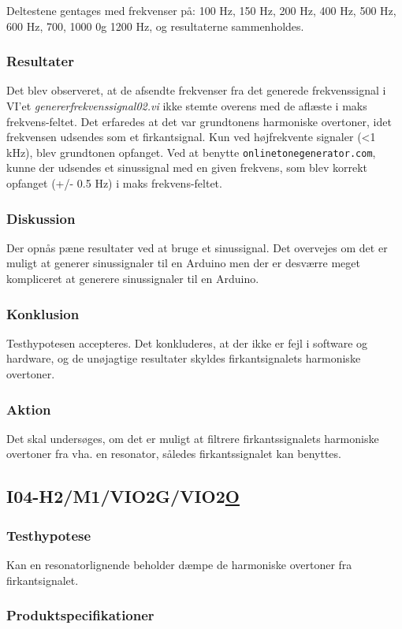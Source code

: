 			Deltestene gentages med frekvenser på: 100 Hz, 150 Hz, 200 Hz, 400 Hz, 500 Hz, 600 Hz, 700, 1000 0g 1200 Hz, og resultaterne sammenholdes. 
			
			\subsubsection{Resultater}
			 Det blev observeret, at de afsendte frekvenser fra det generede frekvenssignal i VI'et \textit{genererfrekvenssignal02.vi} ikke stemte overens med de aflæste i maks frekvens-feltet.  
			 Det erfaredes at det var grundtonens harmoniske overtoner, idet frekvensen udsendes som et firkantsignal. Kun ved højfrekvente signaler (<1 kHz), blev grundtonen opfanget. 
			 Ved at benytte \texttt{onlinetonegenerator.com}, kunne der udsendes et sinussignal med en given frekvens, som blev korrekt opfanget (+/- 0.5 Hz) i maks frekvens-feltet.     
			\subsubsection{Diskussion}
			Der opnås pæne resultater ved at bruge et sinussignal. Det overvejes om det er muligt at generer sinussignaler til en Arduino men der er desværre meget kompliceret at generere sinussignaler til en Arduino.   
			\subsubsection{Konklusion}
			Testhypotesen accepteres. Det konkluderes, at der ikke er fejl i software og hardware, og de unøjagtige resultater skyldes firkantsignalets harmoniske overtoner.  
			\subsubsection{Aktion}
			Det skal undersøges, om det er muligt at filtrere firkantssignalets harmoniske overtoner fra vha. en resonator, således firkantssignalet kan benyttes. 
		
		\subsection{I04-H2/M1/VIO2G/VIO2\underline{O}} 
		\subsubsection{Testhypotese}
		Kan en resonatorlignende beholder dæmpe de harmoniske overtoner fra firkantsignalet. 
		
		\subsubsection{Produktspecifikationer}
		
